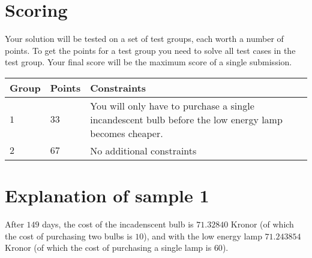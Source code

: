 \section*{Scoring}
Your solution will be tested on a set of test groups, each worth a number of points.
To get the points for a test group you need to solve all test cases in the test group. Your final score will be the maximum score of a single submission.

\noindent
\begin{tabular}{| l | l | p{10cm} |}
  \hline
  Group & Points & Constraints \\ \hline
  $1$    & $33$        &  You will only have to purchase a single incandescent bulb before the low energy lamp becomes cheaper. \\ \hline
  $2$    & $67$        &  No additional constraints \\ \hline
\end{tabular}

\section*{Explanation of sample 1}
After $149$ days, the cost of the incadenscent bulb is $71.32840$ Kronor (of which the cost of purchasing two bulbs is $10$), and with the low energy lamp $71.243854$ Kronor (of which the cost of purchasing a single lamp is $60$).
